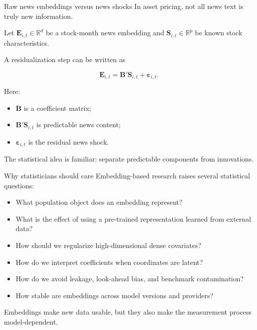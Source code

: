 \documentclass[aspectratio=169]{beamer}
\newcommand{\R}{\mathbb{R}}
\newcommand{\vect}[1]{\boldsymbol{#1}}
\begin{document}
\begin{frame}{Raw news embeddings versus news shocks}
\large
In asset pricing, not all news text is truly new information.

\vspace{0.2cm}

Let \(\vect{E}_{i,t}\in\R^d\) be a stock-month news embedding and \(\vect{S}_{i,t}\in\R^p\) be known stock characteristics.

\vspace{0.2cm}

A residualization step can be written as

\[
\vect{E}_{i,t} = \vect{B}'\vect{S}_{i,t}+\vect{\varepsilon}_{i,t}.
\]

Here:
\begin{itemize}
  \item \(\vect{B}\) is a coefficient matrix;
  \item \(\vect{B}'\vect{S}_{i,t}\) is predictable news content;
  \item \(\vect{\varepsilon}_{i,t}\) is the residual news shock.
\end{itemize}

\vspace{0.15cm}

The statistical idea is familiar: separate predictable components from innovations.
\end{frame}

\begin{frame}{Why statisticians should care}
\large
Embedding-based research raises several statistical questions:

\vspace{0.2cm}

\begin{itemize}
  \item What population object does an embedding represent?
  \item What is the effect of using a pre-trained representation learned from external data?
  \item How should we regularize high-dimensional dense covariates?
  \item How do we interpret coefficients when coordinates are latent?
  \item How do we avoid leakage, look-ahead bias, and benchmark contamination?
  \item How stable are embeddings across model versions and providers?
\end{itemize}

\vspace{0.2cm}

\begin{greenbox}
Embeddings make new data usable, but they also make the measurement process model-dependent.
\end{greenbox}
\end{frame}
\end{document}
